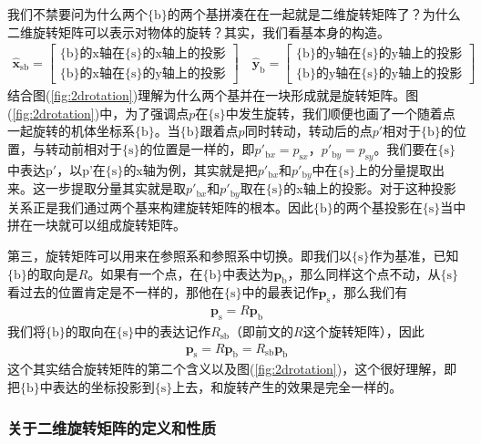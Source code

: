 \documentclass[12pt, a4paper, article, UTF8]{ctexart}
\begin{document}
我们不禁要问为什么两个$\{\text{b}\}$的两个基拼凑在在一起就是二维旋转矩阵了？为什么二维旋转矩阵可以表示对物体的旋转？其实，我们看基本身的构造。
\begin{align}
\hat{\mathbf{x}}_{\text{sb}} = \begin{bmatrix}
\text{\{b\}的x轴在\{s\}的x轴上的投影} \\
\text{\{b\}的x轴在\{s\}的y轴上的投影} 
\end{bmatrix} \quad \hat{\mathbf{y}}_{\text{b}} = \begin{bmatrix}
\text{\{b\}的y轴在\{s\}的y轴上的投影} \\
\text{\{b\}的y轴在\{s\}的y轴上的投影} \label{eq:2drotationprojection}
\end{bmatrix}
\end{align}
结合图(\ref{fig:2drotation})理解为什么两个基并在一块形成就是旋转矩阵。图(\ref{fig:2drotation})中，为了强调点$p$在$\{\text{s}\}$中发生旋转，我们顺便也画了一个随着点一起旋转的机体坐标系$\{\text{b}\}$。当$\{\text{b}\}$跟着点$p$同时转动，转动后的点$p'$相对于$\{\text{b}\}$的位置，与转动前相对于$\{\text{s}\}$的位置是一样的，即$p'_{\text{b}x}=p_{\text{s}x}$，$p'_{\text{b}y}=p_{\text{s}y}$。我们要在$\{\text{s}\}$中表达$\text{p}'$，以p'在$\{\text{s}\}$的x轴为例，其实就是把$p'_{\text{b}x}$和$p'_{\text{b}y}$中在$\{\text{s}\}$上的分量提取出来。这一步提取分量其实就是取$p'_{\text{b}x}$和$p'_{\text{b}y}$取在$\{\text{s}\}$的x轴上的投影。对于这种投影关系正是我们通过两个基来构建旋转矩阵的根本。因此$\{\text{b}\}$的两个基投影在$\{\text{s}\}$当中拼在一块就可以组成旋转矩阵。

第三，旋转矩阵可以用来在参照系和参照系中切换。即我们以$\{\text{s}\}$作为基准，已知$\{\text{b}\}$的取向是$R$。如果有一个点，在$\{\text{b}\}$中表达为$\mathbf{p}_\text{b}$，那么同样这个点不动，从$\{\text{s}\}$看过去的位置肯定是不一样的，那他在$\{\text{s}\}$中的最表记作$\mathbf{p}_\text{s}$，那么我们有
\begin{align}
\mathbf{p}_\text{s} = R\mathbf{p}_\text{b}
\end{align}
我们将$\{\text{b}\}$的取向在$\{\text{s}\}$中的表达记作$R_\text{sb}$（即前文的$R$这个旋转矩阵），因此
\begin{align}
\mathbf{p}_\text{s} =R\mathbf{p}_\text{b}= R_\text{sb}\mathbf{p}_\text{b}
\end{align}
这个其实结合旋转矩阵的第二个含义以及图(\ref{fig:2drotation})，这个很好理解，即把$\{\text{b}\}$中表达的坐标投影到$\{\text{s}\}$上去，和旋转产生的效果是完全一样的。

\subsubsection{关于二维旋转矩阵的定义和性质}
\end{document}
